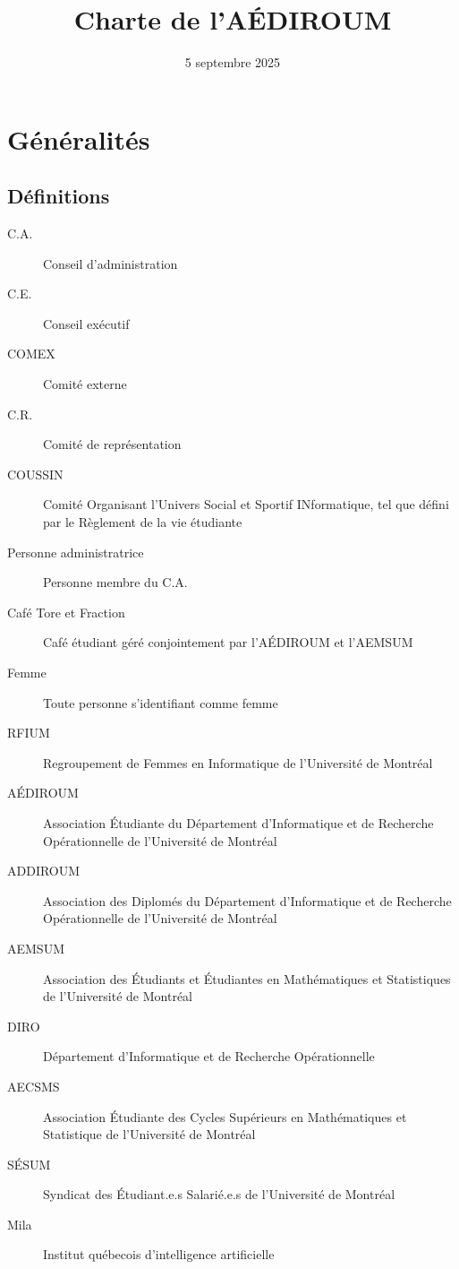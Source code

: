 \documentclass{aediroum}
\title{Charte de l'AÉDIROUM}
\date{5 septembre 2025}
\begin{document}
\maketitle

\section{Généralités}\label{sec:generalites}

\subsection{Définitions}\label{sec:definitions}

\begin{description}
    \item[C.A.] Conseil d’administration
    \item[C.E.] Conseil exécutif
    \item[COMEX] Comité externe
    \item[C.R.] Comité de représentation
    \item[COUSSIN] Comité Organisant l’Univers Social et Sportif INformatique, tel que défini par le Règlement de la vie étudiante
    \item[Personne administratrice] Personne membre du C.A.
    \item[Café Tore et Fraction] Café étudiant géré conjointement par l’AÉDIROUM et l’AEMSUM
    \item[Femme] Toute personne s'identifiant comme femme
    \item[RFIUM] Regroupement de Femmes en Informatique de l'Université de Montréal
    \item[AÉDIROUM] Association Étudiante du Département d'Informatique et de Recherche Opérationnelle de l'Université de Montréal
    \item[ADDIROUM] Association des Diplomés du Département d'Informatique et de Recherche Opérationnelle de l'Université de Montréal
    \item[AEMSUM] Association des Étudiants et Étudiantes en Mathématiques et Statistiques de l'Université de Montréal
    \item[DIRO] Département d'Informatique et de Recherche Opérationnelle
    \item[AECSMS] Association Étudiante des Cycles Supérieurs en Mathématiques et Statistique de l'Université de Montréal
    \item[SÉSUM] Syndicat des Étudiant.e.s Salarié.e.s de l'Université de Montréal
    \item[Mila] Institut québecois d’intelligence artificielle
\end{description}
\end{document}
